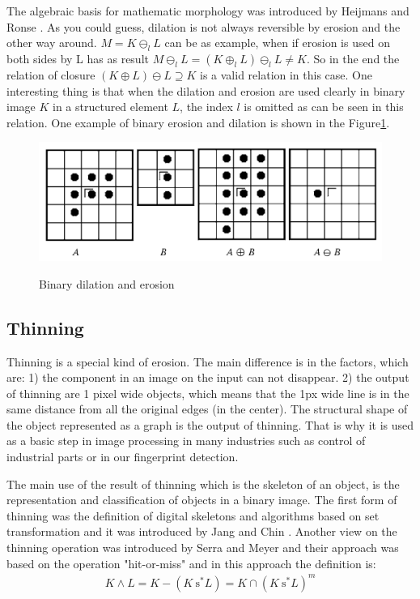 The algebraic basis for mathematic morphology was introduced by Heijmans and Ronse \cite{heijmans1990algebraic}. As you could guess, dilation is not always reversible by erosion and the other way around. $M = K \ominus_l L$ can be as example, when if erosion is used on both sides by L has as result $M \ominus_l L = (K \oplus_l L) \ominus_l L \neq K$. So in the end the relation of closure $(K \oplus L) \ominus L \supseteq K$ is a valid relation in this case. One interesting thing is that when the dilation and erosion are used clearly in binary image $K$ in a structured element $L$, the index $l$ is omitted as can be seen in this relation. One example of binary erosion and dilation is shown in the Figure\ref{fig:dil_morph}. \cite{morph_new}


\begin{figure}[H]
    \centering
        {\includegraphics[width=0.8\linewidth]{obrazky-figures/dil_ero.png}}\\
        \caption{Binary dilation and erosion \cite{shih2009image}}
        \label{fig:dil_morph}
\end{figure}

\subsection{Thinning} \label{thinnin}
Thinning is a special kind of erosion. The main difference is in the factors, which are: 1) the component in an image on the input can not disappear. 2) the output of thinning are 1 pixel wide objects, which means that the 1px wide line is in the same distance from all the original edges (in the center). The structural shape of the object represented as a graph is the output of thinning. That is why it is used as a basic step in image processing in many industries such as control of industrial parts or in our fingerprint detection. \cite{shih2009image}

The main use of the result of thinning which is the skeleton of an object, is the representation and classification of objects in a binary image. The first form of thinning was the definition of digital skeletons and algorithms based on set transformation and it was introduced by Jang and Chin \cite{jang1990analysis}. Another view on the thinning operation was introduced by Serra and Meyer and their approach was based on the operation "hit-or-miss" and in this approach the definition is: \cite{serra1988mathematical}
\begin{align}
K \wedge L=K-\left(K \mathrm{~s}^{*} L\right)=K \cap\left(K \mathrm{~s}^{*} L\right)^{m}
\end{align}

